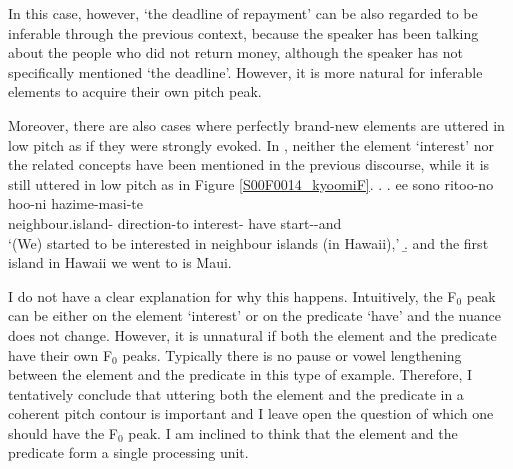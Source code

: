 In this case, however,
 `the deadline of repayment' can be also regarded to be inferable through the previous context,
because the speaker has been talking about the people who did not return money,
although the speaker has not specifically mentioned  `the deadline'.
However, it is more natural for inferable elements
to acquire their own pitch peak.

Moreover,
there are also cases where perfectly brand-new elements are uttered in low pitch as if they were strongly evoked.
In \Next,
neither the element  `interest' nor the related concepts have been mentioned in the previous discourse,
while it is still uttered in low pitch as in Figure \ref{S00F0014_kyoomiF}.
%
\ex.\label{S00F0014_kyoomi}
 \ag. ee sono ritoo-no \tp{\dvline} hoo-ni  \tp{\dvline}  hazime-masi-te \tp{\dvline} \\
        neighbour.island- {} direction-to interest- {} have start--and {} \\
      `(We) started to be interested in neighbour islands (in Hawaii),'
 \b. and the first island in Hawaii we went to is Maui.

I do not have a clear explanation for why this happens.
Intuitively, the F$_{0}$ peak can be either on the element  `interest' or on the predicate  `have'
and the nuance does not change.
However, it is unnatural if both the element and the predicate have their own F$_{0}$ peaks.
Typically there is no pause or vowel lengthening between the element and the predicate in this type of example.
Therefore, I tentatively conclude that uttering both the element and the predicate in a coherent pitch contour is important and I leave open the question of which one should have the F$_{0}$ peak.
I am inclined to think that the element and the predicate form a single processing unit.

